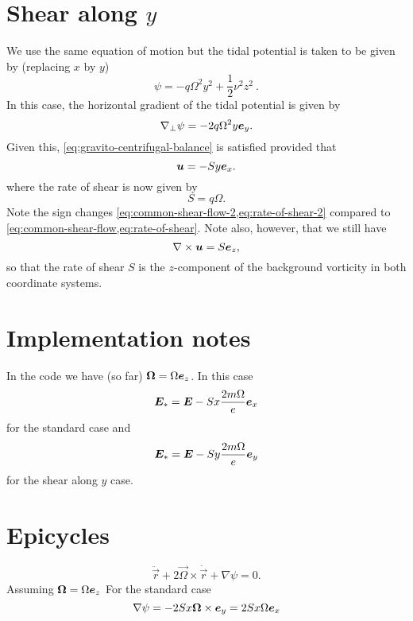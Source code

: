 \documentclass[aps,pre,notitlepage,amsmath,amssymb,amsfonts,nobibnotes,nofootinbib,superscriptaddress,onecolumn,a4paper,10pt]{revtex4-1}
\begin{document}
\section{Shear along $y$}
We use the same equation of motion but the tidal potential is taken to be
given by (replacing $x$ by $y$)
\begin{equation}
  \psi = -q\Omega^2 y^2 + \frac{1}{2}\nu^2 z^2  \ .
\end{equation}
In this case, the horizontal gradient of the tidal potential is given by
\begin{equation}
   \nabla_\perp\psi = -2q\Omega^2 y\bm{e}_y.
\end{equation}
Given this, \cref{eq:gravito-centrifugal-balance} is satisfied provided that
\begin{equation}
  \label{eq:common-shear-flow-2}
  \bm{u} = -Sy\bm{e}_x.
\end{equation}
where the rate of shear is now given by
\begin{equation}
  \label{eq:rate-of-shear-2}
  S = q\Omega.
\end{equation}
Note the sign changes \cref{eq:common-shear-flow-2,eq:rate-of-shear-2}
compared to \cref{eq:common-shear-flow,eq:rate-of-shear}. Note also, however,
that we still have
\begin{equation}
  \nabla\times\bm{u} = S\bm{e}_z,
\end{equation}
so that the rate of shear $S$ is the $z$-component of the background vorticity
in both coordinate systems.

\section{Implementation notes}
In the code we have (so far) $\bm{\Omega} = \Omega \bm{e}_z$. In this case
\begin{equation}
  \bm{E}_\ast = \bm{E} - Sx \frac{2m\Omega}{e} \bm{e}_x
\end{equation}
for the standard case and
\begin{equation}
  \bm{E}_\ast = \bm{E} - Sy \frac{2m\Omega}{e} \bm{e}_y
\end{equation}
for the shear along $y$ case.

\section{Epicycles}
\begin{equation}
  \ddot{\vec{r}} + 2\vec{\Omega}\times\dot{\vec{r}} + \nabla\psi = 0.
\end{equation}
Assuming $\bm{\Omega} = \Omega \bm{e}_z$
For the standard case
\begin{equation}
\nabla \psi = -2Sx\bm{\Omega}\times \bm{e}_y = 2Sx\Omega \bm{e}_x
\end{equation}
\end{document}
